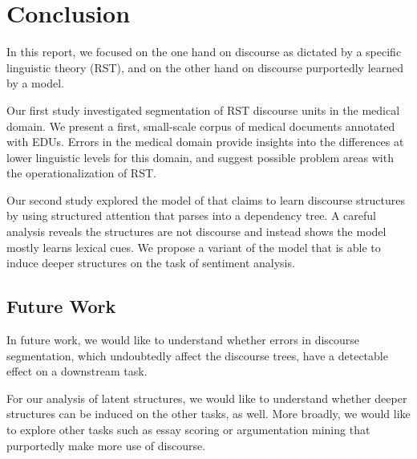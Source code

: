 \chapter{Conclusion}
\label{ch:conclusion}

In this report, we focused on the one hand on discourse as dictated by a specific linguistic theory (RST), and on the other hand on discourse purportedly learned by a model. 

Our first study investigated segmentation of RST discourse units in the medical domain. We present a first, small-scale corpus of medical documents annotated with EDUs. Errors in the medical domain provide insights into the differences at lower linguistic levels for this domain, and suggest possible problem areas with the operationalization of RST.

Our second study explored the model of  that claims to learn discourse structures by using structured attention that parses into a dependency tree. A careful analysis reveals the structures are not discourse and instead shows the model mostly learns lexical cues. We propose a variant of the model that is able to induce deeper structures on the task of sentiment analysis.

\section{Future Work}
In future work, we would like to understand whether errors in discourse segmentation, which undoubtedly affect the discourse trees, have a detectable effect on a downstream task. 

For our analysis of latent structures, we would like to understand whether deeper structures can be induced on the other tasks, as well. More broadly, we would like to explore other tasks such as essay scoring or argumentation mining that purportedly make more use of discourse.